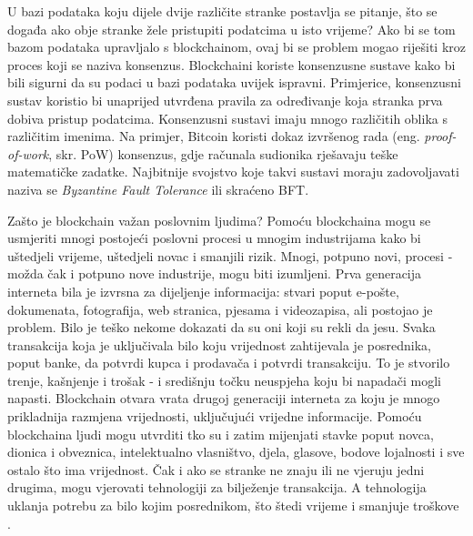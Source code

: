 \documentclass[times, utf8, diplomski]{fer}
\begin{document}
U bazi podataka koju dijele dvije različite stranke postavlja se pitanje, što se događa ako obje stranke žele pristupiti podatcima u isto vrijeme? Ako bi se tom bazom podataka upravljalo s blockchainom, ovaj bi se problem mogao riješiti kroz proces koji se naziva konsenzus. Blockchaini koriste konsenzusne sustave kako bi bili sigurni da su podaci u bazi podataka uvijek ispravni. Primjerice, konsenzusni sustav koristio bi unaprijed utvrđena pravila za određivanje koja stranka prva dobiva pristup podatcima. Konsenzusni sustavi imaju mnogo različitih oblika s različitim imenima. Na primjer, Bitcoin koristi dokaz izvršenog rada (eng. \textit{proof-of-work}, skr. PoW) konsenzus, gdje računala sudionika rješavaju teške matematičke zadatke. Najbitnije svojstvo koje takvi sustavi moraju zadovoljavati naziva se \textit{Byzantine Fault Tolerance} ili skraćeno BFT. 

Zašto je blockchain važan poslovnim ljudima? Pomoću blockchaina mogu se usmjeriti mnogi postojeći poslovni procesi u mnogim industrijama kako bi uštedjeli vrijeme, uštedjeli novac i smanjili rizik. Mnogi, potpuno novi, procesi - možda čak i potpuno nove industrije,  mogu biti izumljeni. Prva generacija interneta bila je izvrsna za dijeljenje informacija: stvari poput e-pošte, dokumenata, fotografija, web stranica, pjesama i videozapisa, ali postojao je problem. Bilo je teško nekome dokazati da su oni koji su rekli da jesu. Svaka transakcija koja je uključivala bilo koju vrijednost zahtijevala je posrednika, poput banke, da potvrdi kupca i prodavača i potvrdi transakciju. To je stvorilo trenje, kašnjenje i trošak - i središnju točku neuspjeha koju bi napadači mogli napasti. Blockchain otvara vrata drugoj generaciji interneta za koju je mnogo prikladnija razmjena vrijednosti, uključujući vrijedne informacije. Pomoću blockchaina ljudi mogu utvrditi tko su i zatim mijenjati stavke poput novca, dionica i obveznica, intelektualno vlasništvo, djela, glasove, bodove lojalnosti i sve ostalo što ima vrijednost. Čak i ako se stranke ne znaju ili ne vjeruju jedni drugima, mogu vjerovati tehnologiji za bilježenje transakcija. A tehnologija uklanja potrebu za bilo kojim posrednikom, što štedi vrijeme i smanjuje troškove \cite{intro}.
\end{document}
